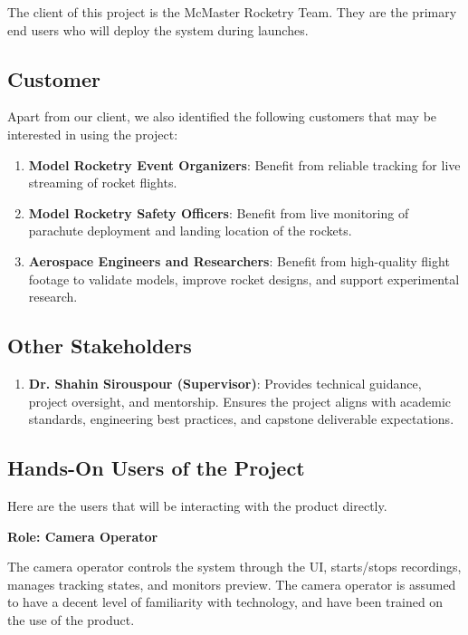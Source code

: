 \documentclass[12pt]{article}
\begin{document}
The client of this project is the McMaster Rocketry Team. They are the primary
end users who will deploy the system during launches.

\subsection{Customer}

Apart from our client, we also identified the following customers that may be
interested in using the project:

\begin{enumerate}
  \item \textbf{Model Rocketry Event Organizers}: Benefit from
        reliable tracking for live streaming of rocket flights.
  \item \textbf{Model Rocketry Safety Officers}: Benefit from
        live monitoring of parachute deployment and landing location
        of the rockets.
  \item \textbf{Aerospace Engineers and Researchers}: Benefit from
        high-quality flight footage to validate models, improve rocket
        designs, and support experimental research.
\end{enumerate}

\subsection{Other Stakeholders}

\begin{enumerate}
  \item \textbf{Dr. Shahin Sirouspour (Supervisor)}: Provides
        technical guidance, project oversight, and mentorship. Ensures
        the project aligns with academic standards, engineering best
        practices, and capstone deliverable expectations.
\end{enumerate}

\subsection{Hands-On Users of the Project}

Here are the users that will be interacting with the product directly.

\textbf{Role: Camera Operator}

The camera operator controls the system through the UI, starts/stops
recordings, manages tracking states, and monitors preview. The camera operator
is assumed to have a decent level of familiarity with technology, and have been
trained on the use of the product.
\end{document}
